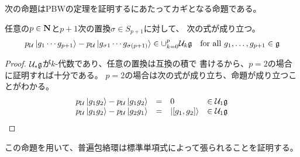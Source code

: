{	次の命題はPBWの定理を証明するにあたってカギとなる命題である。

	\begin{proposition}[普遍包絡環の簡約]\label{prop:普遍包絡環の簡約} %
		任意の$p\in\mathbf{N}$と$p+1$次の置換$\sigma\in S_{p+1}$に対して、
		次の式が成り立つ。
		\begin{equation*}\begin{split}
			p_{{\mathcal{U}}}\mathinner{|{g_1\cdots g_{p+1}}\rangle}
			- p_{{\mathcal{U}}}\mathinner{|{g_{\sigma1}\cdots g_{\sigma(p+1)}}\rangle}
			\in \cup_{k=0}^p{{\mathcal{U}}}_k{\mathfrak{g}}
			\quad\text{for all } g_1,\dots,g_{p+1}\in {\mathfrak{g}}
		\end{split}\end{equation*}
	\end{proposition} %
	\begin{proof} ${{\mathcal{U}}}_*{\mathfrak{g}}$が$k$-代数であり、任意の置換は互換の積で
	書けるから、$p=2$の場合に証明すれば十分である。
	$p=2$の場合は次の式が成り立ち、命題が成り立つことがわかる。
	\begin{equation*}\begin{array}{rcll}
		p_{{\mathcal{U}}}\mathinner{|{g_1g_2}\rangle} - p_{{\mathcal{U}}}\mathinner{|{g_1g_2}\rangle} &=& 0 & \in{\ensuremath{{\mathcal{U}}}}_1{\mathfrak{g}} \\
		p_{{\mathcal{U}}}\mathinner{|{g_1g_2}\rangle} - p_{{\mathcal{U}}}\mathinner{|{g_2g_1}\rangle} &=& \mathinner{|{[g_1,g_2]}\rangle}
			& \in{\ensuremath{{\mathcal{U}}}}_1{\mathfrak{g}} \\
	\end{array}\end{equation*}
	\end{proof}

	この命題を用いて、普遍包絡環は標準単項式によって張られることを証明する。

}
